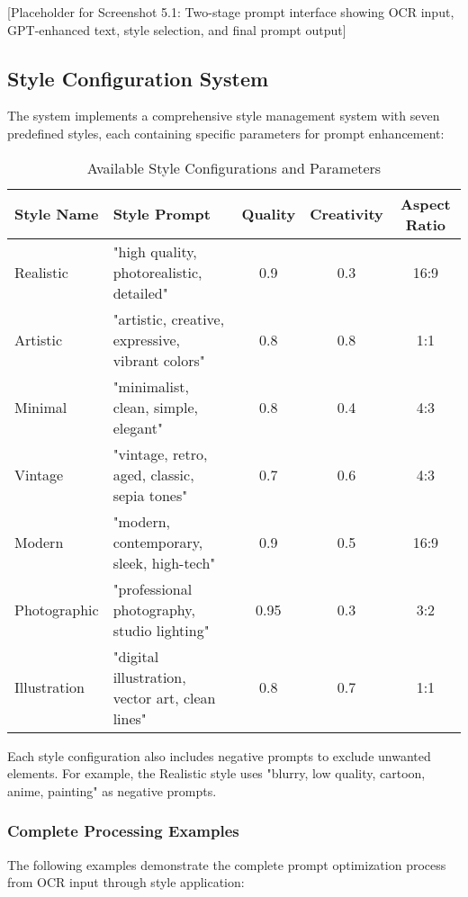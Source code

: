[Placeholder for Screenshot 5.1: Two-stage prompt interface showing OCR input, GPT-enhanced text, style selection, and final prompt output]

\subsection{Style Configuration System}

The system implements a comprehensive style management system with seven predefined styles, each containing specific parameters for prompt enhancement:

\begin{table}[H]
\centering
\caption{Available Style Configurations and Parameters}
\label{tab:style_configurations}
{\begin{tabular}{llccc}
\toprule
\textbf{Style Name} & \textbf{Style Prompt} & \textbf{Quality} & \textbf{Creativity} & \textbf{Aspect Ratio} \\
\midrule
Realistic & "high quality, photorealistic, detailed" & 0.9 & 0.3 & 16:9 \\
Artistic & "artistic, creative, expressive, vibrant colors" & 0.8 & 0.8 & 1:1 \\
Minimal & "minimalist, clean, simple, elegant" & 0.8 & 0.4 & 4:3 \\
Vintage & "vintage, retro, aged, classic, sepia tones" & 0.7 & 0.6 & 4:3 \\
Modern & "modern, contemporary, sleek, high-tech" & 0.9 & 0.5 & 16:9 \\
Photographic & "professional photography, studio lighting" & 0.95 & 0.3 & 3:2 \\
Illustration & "digital illustration, vector art, clean lines" & 0.8 & 0.7 & 1:1 \\
\bottomrule
\end{tabular}}
\end{table}

Each style configuration also includes negative prompts to exclude unwanted elements. For example, the Realistic style uses "blurry, low quality, cartoon, anime, painting" as negative prompts.

\subsubsection{Complete Processing Examples}

The following examples demonstrate the complete prompt optimization process from OCR input through style application:

